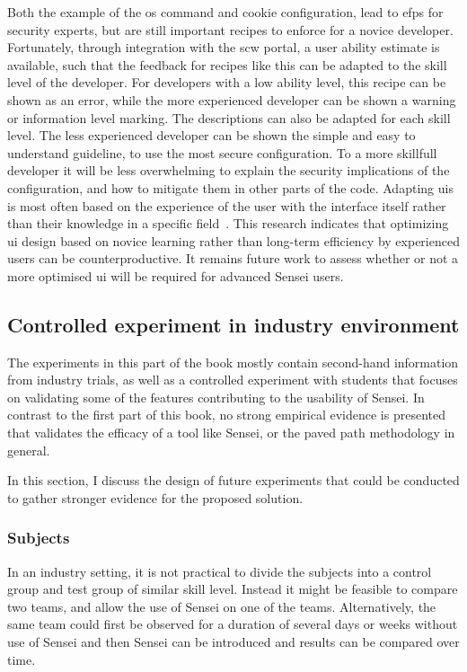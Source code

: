 Both the example of the \gls{os} command and cookie configuration, lead to \glspl{efp} for security experts, but are still important recipes to enforce for a novice developer.
Fortunately, through integration with the \gls{scw} portal, a user ability estimate is available, such that the feedback for recipes like this can be adapted to the skill level of the developer.
For developers with a low ability level, this recipe can be shown as an error, while the more experienced developer can be shown a warning or information level marking.
The descriptions can also be adapted for each skill level.
The less experienced developer can be shown the simple and easy to understand guideline, to use the most secure configuration.
To a more skillfull developer it will be less overwhelming to explain the security implications of the configuration, and how to mitigate them in other parts of the code.
Adapting \glspl{ui} is most often based on the experience of the user with the interface itself rather than their knowledge in a specific field~\cite{johnson2015bespoke, cockburn2014supporting}.
This research indicates that optimizing \gls{ui} design based on novice learning rather than long-term efficiency by experienced users can be counterproductive.
It remains future work to assess whether or not a more optimised \gls{ui} will be required for advanced Sensei users.

\subsection{Controlled experiment in industry environment}

The experiments in this part of the book mostly contain second-hand information from industry trials, as well as a controlled experiment with students that focuses on validating some of the features contributing to the usability of Sensei.
In contrast to the first part of this book, no strong empirical evidence is presented that validates the efficacy of a tool like Sensei, or the paved path methodology in general.

In this section, I discuss the design of future experiments that could be conducted to gather stronger evidence for the proposed solution.

\subsubsection{Subjects}
In an industry setting, it is not practical to divide the subjects into a control group and test group of similar skill level.
Instead it might be feasible to compare two teams, and allow the use of Sensei on one of the teams.
Alternatively, the same team could first be observed for a duration of several days or weeks without use of Sensei and then Sensei can be introduced and results can be compared over time.

